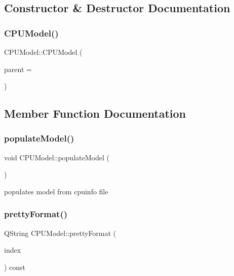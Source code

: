 \subsection{Constructor \& Destructor Documentation}
\mbox{\label{class_c_p_u_model_aecf961723e84bc4d1782d2ecc2228e3d}} 
\subsubsection{\texorpdfstring{C\+P\+U\+Model()}{CPUModel()}}
{\footnotesize\ttfamily C\+P\+U\+Model\+::\+C\+P\+U\+Model (\begin{DoxyParamCaption}\item[{Q\+Object $\ast$}]{parent = {} }\end{DoxyParamCaption})}



\subsection{Member Function Documentation}
\mbox{\label{class_c_p_u_model_a5d940e548d8e38476161a86f92a76aeb}} 
\subsubsection{\texorpdfstring{populate\+Model()}{populateModel()}}
{\footnotesize\ttfamily void C\+P\+U\+Model\+::populate\+Model (\begin{DoxyParamCaption}{ }\end{DoxyParamCaption})}

populates model from cpuinfo file \mbox{\label{class_c_p_u_model_a69b8398765d4e00e7394ddc1cf83b663}} 
\subsubsection{\texorpdfstring{pretty\+Format()}{prettyFormat()}}
{\footnotesize\ttfamily Q\+String C\+P\+U\+Model\+::pretty\+Format (\begin{DoxyParamCaption}\item[{int}]{index }\end{DoxyParamCaption}) const}

